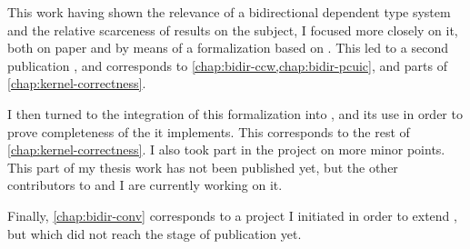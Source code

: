 This work having shown the relevance of a bidirectional dependent type system and the relative
scarceness of results on the subject, I focused more closely on it, both on
paper and by means of a formalization based on . This led to a second publication
, and corresponds to \cref{chap:bidir-ccw,chap:bidir-pcuic},
and parts of \cref{chap:kernel-correctness}.

I then turned to the integration of this formalization into , and its use
in order to prove completeness of the  it implements. This corresponds to the
rest of \cref{chap:kernel-correctness}. I also took part in the project on more minor points.
This part of my thesis work has not been published yet, but the other contributors to
 and I are currently working on it.

Finally, \cref{chap:bidir-conv} corresponds to a project I initiated in order to extend
, but which did not reach the stage of publication yet.